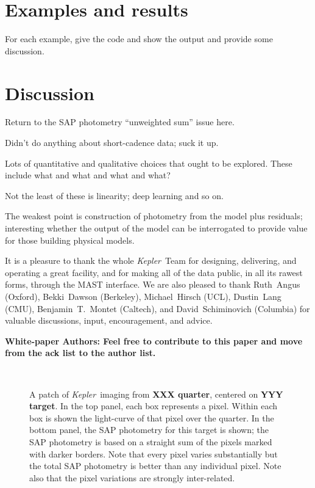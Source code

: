 \documentclass[12pt, preprint]{aastex}
\newcommand{\project}[1]{\textsl{#1}}
\newcommand{\Kepler}{\project{Kepler}}
\newcommand{\todo}[1]{\textbf{#1}}
\begin{document}
\section{Examples and results}

For each example, give the code and show the output and provide some discussion.

\section{Discussion}

Return to the SAP photometry ``unweighted sum'' issue here.

Didn't do anything about short-cadence data; suck it up.

Lots of quantitative and qualitative choices that ought to be explored.
These include what and what and what and what?

Not the least of these is linearity; deep learning and so on.

The weakest point is construction of photometry from the model plus residuals;
  interesting whether the output of the model can be interrogated
  to provide value for those building physical models.

\acknowledgements
It is a pleasure to thank the whole \Kepler\ Team
  for designing, delivering, and operating a great facility,
  and for making all of the data public, in all its rawest forms, through the MAST interface.
We are also pleased to thank
  Ruth~Angus (Oxford),
  Bekki~Dawson (Berkeley),
  Michael~Hirsch (UCL),
  Dustin~Lang (CMU),
  Benjamin~T.~Montet (Caltech),
  and
  David~Schiminovich (Columbia)
for valuable discussions, input, encouragement, and advice.

\todo{White-paper Authors:  Feel free to contribute to this paper and move from the ack list to the author list.}

\clearpage
\begin{figure}
~ %
\caption{A patch of \Kepler\ imaging from \todo{XXX quarter}, centered on \todo{YYY target}.
  In the top panel, each box represents a pixel.
  Within each box is shown the light-curve of that pixel over the quarter.
  In the bottom panel, the SAP photometry for this target is shown;
  the SAP photometry is based on a straight sum of the pixels marked with darker borders.
  Note that every pixel varies substantially but the total SAP photometry is better than any individual pixel.
  Note also that the pixel variations are strongly inter-related.\label{fig:pixelpatch}}
\end{figure}
\end{document}
